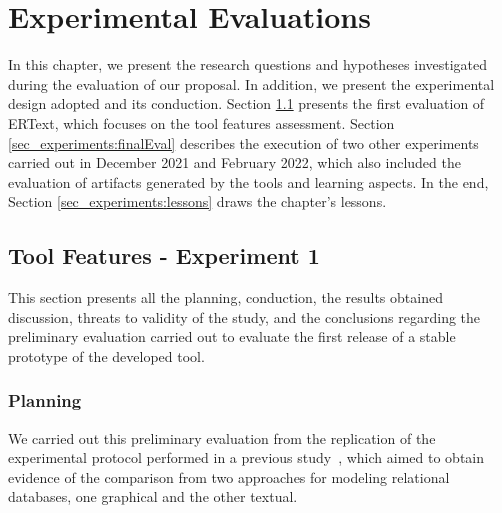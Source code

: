 \chapter{Experimental Evaluations}\label{chap:experiments}

In this chapter, we present the research questions and hypotheses investigated during the evaluation of our proposal. 
In addition, we present the experimental design adopted and its conduction.
Section \ref{sec_experiments:preliminaryEval} presents the first evaluation of ERText, which focuses on the tool features assessment.
Section \ref{sec_experiments:finalEval} describes the execution of two other experiments carried out in December 2021 and February 2022, which also included the evaluation of artifacts generated by the tools and learning aspects.
In the end, Section \ref{sec_experiments:lessons} draws the chapter's lessons.

\section{Tool Features - Experiment 1} 
\label{sec_experiments:preliminaryEval}

This section presents all the planning, conduction, the results obtained discussion, threats to validity of the study, and the conclusions regarding the preliminary evaluation carried out to evaluate the first release of a stable prototype of the developed tool.

\subsection{Planning}
\label{ssec_experiments:preliminary_planning}

We carried out this preliminary evaluation from the replication of the experimental protocol performed in a previous study~\cite{Lopes:2019}, which aimed to obtain evidence of the comparison from two approaches for modeling relational databases, one graphical and the other textual.

